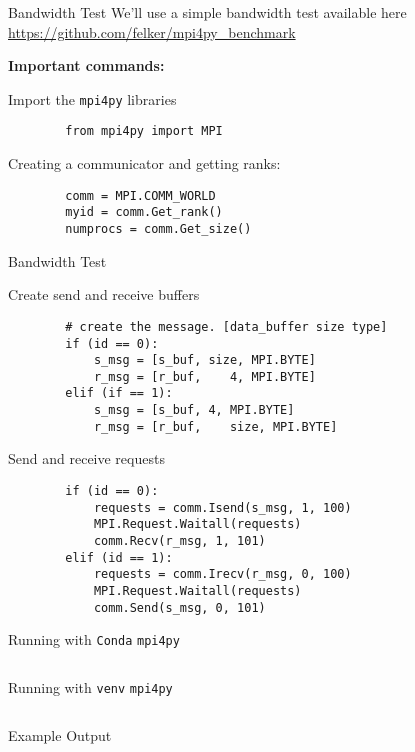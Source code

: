 \begin{frame}[fragile]{Bandwidth Test}
	We'll use a simple bandwidth test available here \url{https://github.com/felker/mpi4py_benchmark}
	
\textbf{Important commands:}
	
	Import the \texttt{mpi4py} libraries
	\begin{verbatim}
		from mpi4py import MPI
	\end{verbatim}

    Creating a communicator and getting ranks:
    \begin{verbatim}
    	comm = MPI.COMM_WORLD
    	myid = comm.Get_rank()
    	numprocs = comm.Get_size()
    \end{verbatim}
\end{frame}

\begin{frame}[fragile]{Bandwidth Test}
	
	Create send and receive buffers
	\begin{verbatim}
		# create the message. [data_buffer size type]
		if (id == 0):
			s_msg = [s_buf, size, MPI.BYTE]
			r_msg = [r_buf,    4, MPI.BYTE]
		elif (if == 1):
		 	s_msg = [s_buf, 4, MPI.BYTE]
		 	r_msg = [r_buf,    size, MPI.BYTE]
	\end{verbatim}
	
	Send and receive requests
	\begin{verbatim}
		if (id == 0):
			requests = comm.Isend(s_msg, 1, 100)
			MPI.Request.Waitall(requests)
			comm.Recv(r_msg, 1, 101)
		elif (id == 1):
			requests = comm.Irecv(r_msg, 0, 100)
			MPI.Request.Waitall(requests)
			comm.Send(s_msg, 0, 101)
	\end{verbatim}
\end{frame}

\begin{frame}[fragile]{Running with \texttt{Conda} \texttt{mpi4py}}
	\inputminted{sh}{examples/mpi4py/run_conda_env.sbatch}
\end{frame}

\begin{frame}[fragile]{Running with \texttt{venv} \texttt{mpi4py}}
	\inputminted{sh}{examples/mpi4py/run_venv.sbatch}
\end{frame}

\begin{frame}[fragile]{Example Output}
	\inputminted{text}{examples/mpi4py/sample_output.txt}
\end{frame}

